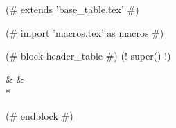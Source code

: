 (# extends 'base_table.tex' #)

(# import 'macros.tex' as macros #)


(# block header_table #)
(! super() !)

  &    &  \\*

(# endblock #)